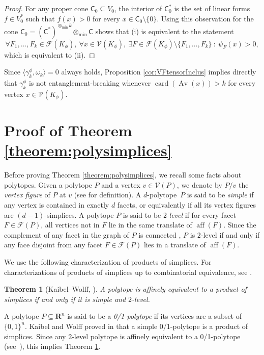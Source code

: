 \documentclass{amsart}
\newcommand{\st}{\ : \ }
\renewcommand{\subset}{\subseteq}
\newcommand{\gC}{\mathsf{C}}
\newcommand{\R}{\mathbf{R}}
\DeclareMathOperator{\card}{\mathrm{card}}
\DeclareMathOperator{\aff}{\mathrm{aff}}
\def\lb{\left(}
\def\rb{\right)}
\DeclareMathOperator{\Av}{Av}
\theoremstyle{plain}
\newtheorem{theorem}{Theorem}
\newcommand{\tmin}{{\otimes_{\min}}}
\begin{document}
\begin{proof}
For any proper cone $\gC_0 \subset V_0$, the interior of $\gC_0^*$ is the set of linear forms $f \in V_0^*$ such that $f(x)>0$ for every $x \in \gC_0\setminus \{0\}$. Using this observation for the cone $\gC_0 = \left(\gC^*\right)^{\tmin k} \tmin \gC$ shows that (i) is equivalent to the statement
\[ \forall F_1,\dots,F_k \in \mathcal{F}(K_\phi),\ \forall x \in \mathcal{V}(K_\phi),\ \exists F \in \mathcal{F}(K_\phi) \setminus \{F_1,\dots,F_k\} \st \psi_F(x) > 0,\]
which is equivalent to (ii).
\end{proof}

Since $\langle \gamma_k^\phi , \omega_k \rangle = 0$ always holds, Proposition \ref{cor:VFtensorInclus} implies directly that $\gamma_k^\phi$ is not entanglement-breaking whenever $\card (\Av\lb x\rb) > k$ for every vertex $x\in \mathcal{V}(K_\phi)$.

\section{Proof of Theorem \ref{theorem:polysimplices}} \label{sec:PolySimpl}

Before proving Theorem \ref{theorem:polysimplices}, we recall some facts about polytopes. Given a polytope $P$ and a vertex $v \in \mathcal{V}(P)$, we denote by $P/v$ the \emph{vertex figure} of $P$ at $v$ (see \cite[Chapter 2.1]{Grunbaum} for definition). A $d$-polytope~$P$ is said to be \emph{simple} if any vertex is contained in exactly $d$ facets, or equivalently if all its vertex figures are $(d-1)$-simplices. A polytope $P$ is said to be $2$-\emph{level} if for every facet $F \in \mathcal{F}(P)$, all vertices not in $F$ lie in the same translate of $\aff(F)$. Since the complement of any facet in the graph of $P$ is connected \cite[p.\ 475]{Sallee67}, $P$ is $2$-level if and only if any face disjoint from any facet $F \in \mathcal{F}(P)$ lies in a translate of $\aff(F)$.

We use the following characterization of products of simplices. For characterizations of products of simplices up to combinatorial equivalence, see \cite{YuMasuda21}.

\begin{theorem}[Kaibel--Wolff, \cite{KaibelWolff00}] \label{theorem:kaibelwolff}
A polytope is affinely equivalent to a product of simplices if and only if it is simple and $2$-level.
\end{theorem}

A polytope $P \subset \R^n$ is said to be a \emph{0/1-polytope} if its vertices are a subset of $\{0,1\}^n$. Kaibel and Wolff proved in \cite{KaibelWolff00} that a simple 0/1-polytope is a product of simplices. Since any $2$-level polytope is affinely equivalent to a 0/1-polytope (see~\cite{GPT10}), this implies Theorem \ref{theorem:kaibelwolff}.
\end{document}
